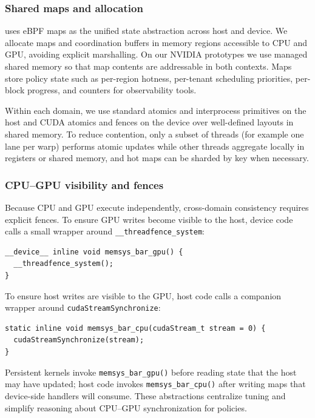 \subsubsection{Shared maps and allocation}

\sys uses eBPF maps as the unified state abstraction across host and device. We
allocate maps and coordination buffers in memory regions accessible to CPU and GPU,
avoiding explicit marshalling. On our NVIDIA prototypes we use managed shared
memory so that map contents are addressable in both contexts. Maps store policy
state such as per-region hotness, per-tenant scheduling priorities, per-block
progress, and counters for observability tools.

Within each domain, we use standard atomics and interprocess primitives on the
host and CUDA atomics and fences on the device over well-defined layouts in
shared memory. To reduce contention, only a subset of threads (for example one
lane per warp) performs atomic updates while other threads aggregate locally in
registers or shared memory, and hot maps can be sharded by key when necessary.

\subsubsection{CPU–GPU visibility and fences}

Because CPU and GPU execute independently, cross-domain consistency requires
explicit fences. To ensure GPU writes become visible to the host, device code
calls a small wrapper around \texttt{\_\_threadfence\_system}:

\begin{verbatim}
__device__ inline void memsys_bar_gpu() {
  __threadfence_system();
}
\end{verbatim}

To ensure host writes are visible to the GPU, host code calls a companion wrapper
around \texttt{cudaStreamSynchronize}:

\begin{verbatim}
static inline void memsys_bar_cpu(cudaStream_t stream = 0) {
  cudaStreamSynchronize(stream);
}
\end{verbatim}

Persistent kernels invoke \texttt{memsys\_bar\_gpu()} before reading state that the
host may have updated; host code invokes \texttt{memsys\_bar\_cpu()} after writing
maps that device-side handlers will consume. These abstractions centralize tuning
and simplify reasoning about CPU–GPU synchronization for \sys policies.

